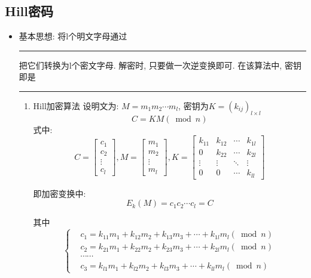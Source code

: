 \documentclass[UTF8]{ctexart}
\newcommand\hl{\bgroup\markoverwith
  {\textcolor{yellow}{\rule[-.5ex]{2pt}{2.5ex}}}\ULon}
\begin{document}
    \subsection{Hill密码}
    \begin{itemize}
        \item 基本思想: 将l个明文字母通过\hl{线性变换}把它们转换为l个密文字母. 解密时, 只要做一次逆变换即可. 在该算法中, 密钥即是\hl{变换举证}
        \begin{enumerate}
            \renewcommand\labelenumi{(\theenumi)}
            \item Hill加密算法
            设明文为: $M=m_1m_2\cdots m_l$, 密钥为$K=(k_{ij})_{l\times l}$
            $$C=KM(\bmod n)$$
            式中:
            \begin{equation}
                C=\left[ \begin{array}{c}{c_{1}} \\ {c_{2}} \\ {\vdots} \\ {c_{l}}\end{array}\right],
                M=\left[ \begin{array}{c}{m_{1}} \\ {m_{2}} \\ {\vdots} \\ {m_{l}}\end{array}\right],
                K=\left[ \begin{array}{cccc}{k_{11}} & {k_{12}} & {\cdots} & {k_{1 l}} \\ {0} & {k_{22}} & {\cdots} & {k_{2 l}} \\ {\vdots} & {\vdots} & {\ddots} & {\vdots} \\ {0} & {0} & {\cdots} & {k_{l l}}\end{array}\right]
            \end{equation}

            即加密变换中:
            $$E_k(M) = c_1c_2\cdots c_l = C$$

            其中
            \begin{equation}
                \left\{
                    \begin{aligned} &c_1=k_{11}m_1+k_{12}m_2+k_{13}m_3+\cdots +k_{1l}m_l (\bmod n)\\
                                    &c_2=k_{21}m_1+k_{22}m_2+k_{23}m_3+\cdots +k_{2l}m_l (\bmod n)\\
                                    &\cdots \cdots \\
                                    &c_3=k_{l1}m_1+k_{l2}m_2+k_{l3}m_3+\cdots +k_{ll}m_l (\bmod n)
                    \end{aligned}\right.
            \end{equation}


\end{enumerate}
\end{itemize}
\end{document}
